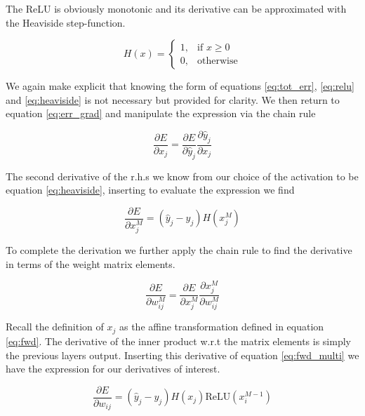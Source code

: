 \noindent The ReLU is obviously monotonic and its derivative can be approximated with the Heaviside step-function. 

\begin{equation}\label{eq:heaviside}
H(x) = 	\begin{cases}1, & \text{if } x \geq 0 \\
	0,  & \text{otherwise}
\end{cases}
\end{equation}

\noindent We again make explicit that knowing the form of equations \ref{eq:tot_err}, \ref{eq:relu} and \ref{eq:heaviside} is not necessary but provided for clarity. We then return to equation \ref{eq:err_grad} and manipulate the expression via the chain rule 

\begin{equation}
\frac{\partial E}{\partial x_{j}}= \frac{\partial E}{\partial \hat{y}_{j}}\frac{\partial \hat{y}_{j}}{\partial x_{j}}
\end{equation}

\noindent The second derivative of the r.h.s we know from our choice of the activation to be equation \ref{eq:heaviside}, inserting to evaluate the expression we find 

\begin{equation}\label{eq:dedx}
\frac{\partial E}{\partial x_{j}^M} = (\hat{y}_{j} - y_{j}) H(x_j^M)
\end{equation}

\noindent To complete the derivation we further apply the chain rule to find the derivative in terms of the weight matrix elements.

\begin{equation}
\frac{\partial E}{\partial w_{ij}^M} = \frac{\partial E}{\partial x_{j}^M} \frac{\partial x_{j}^M}{\partial w_{ij}^M} 
\end{equation}

\noindent Recall the definition of $x_j$ as the affine transformation defined in equation \ref{eq:fwd}. The derivative of the inner product w.r.t the matrix elements is simply the previous layers output. Inserting this derivative of equation \ref{eq:fwd_multi} we have the expression for our derivatives of interest.

\begin{equation}\label{eq:dedw}
\frac{\partial E}{\partial w_{ij}} = (\hat{y}_{j} - y_{j}) H(x_j) \text{ReLU}(x_i^{M-1})
\end{equation}

